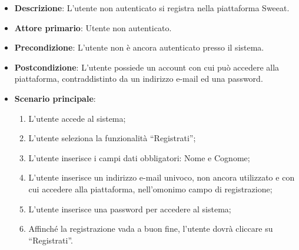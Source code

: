 \begin{itemize}
\item \textbf{Descrizione}: L'utente non autenticato si registra nella piattaforma Sweeat.
\item \textbf{Attore primario}: Utente non autenticato.
\item \textbf{Precondizione}: L'utente non è ancora autenticato presso il sistema.
\item \textbf{Postcondizione}: L’utente possiede un account con cui può accedere alla piattaforma, contraddistinto da un indirizzo e-mail ed una password.

\item \textbf{Scenario principale}:
\begin{enumerate}
\item L’utente accede al sistema;
\item L’utente seleziona la funzionalità “Registrati”;
\item L'utente inserisce i campi dati obbligatori: Nome e Cognome;
\item L’utente inserisce un indirizzo e-mail univoco, non ancora utilizzato e con cui accedere alla piattaforma, nell'omonimo campo di registrazione; 
\item L’utente inserisce una password per accedere al sistema;
\item Affinché la registrazione vada a buon fine, l’utente dovrà cliccare su “Registrati”.
\end{enumerate}


\end{itemize}

